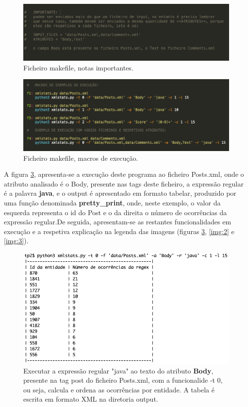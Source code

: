 \documentclass[11pt,a4paper]{report}%
\begin{document}
\begin{figure}[h]
	\centering
	\includegraphics[scale=0.40]{mk3.png}
	\caption{Ficheiro makefile, notas importantes.}
	\label{img:mk3}
\end{figure}

\begin{figure}[h]
	\centering
	\includegraphics[scale=0.40]{mk4.png}
	\caption{Ficheiro makefile, macros de execução.}
	\label{img:mk4}
\end{figure}

A figura \ref{img:1}, apresenta-se a execução deste programa ao ficheiro Posts.xml, onde o atributo analisado é o Body, presente nas tags deste ficheiro, a expressão regular é a palavra \textbf{java}, e o output é apresentado em formato tabelar, produzido por uma função denominada \textbf{pretty\_print}, onde, neste exemplo, o valor da esquerda representa o id do Post e o da direita o número de ocorrências da expressão regular.\newline \newline De seguida, apresentam-se as restantes funcionalidades em execução e a respetiva explicação na legenda das imagens (figuras \ref{img:1}, \ref{img:2} e \ref{img:3}).

\begin{figure}[h]
	\centering
	\includegraphics[scale=0.6]{1.png}
	\caption{Executar a expressão regular "java" ao texto do atributo \textbf{Body}, presente na tag post do ficheiro Posts.xml, com a funcionalide -t 0, ou seja, calcula e ordena as ocorrências por entidade. A tabela é escrita em formato XML na diretoria output.}
	\label{img:1}
\end{figure}
\end{document}
